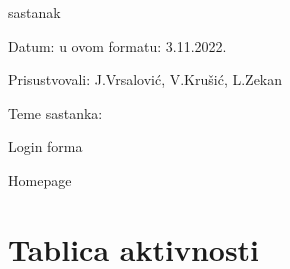 \begin{packed_enum}
			\item  sastanak
			\item[] \begin{packed_item}
				\item Datum: u ovom formatu: 3.11.2022.
				\item Prisustvovali: J.Vrsalović, V.Krušić, L.Zekan
				\item Teme sastanka:
				\begin{packed_item}
					\item  Login forma
					\item  Homepage
				\end{packed_item}
			\end{packed_item}
			
			
			
		\end{packed_enum}
		
		\eject
		\section*{Tablica aktivnosti}
		
			

